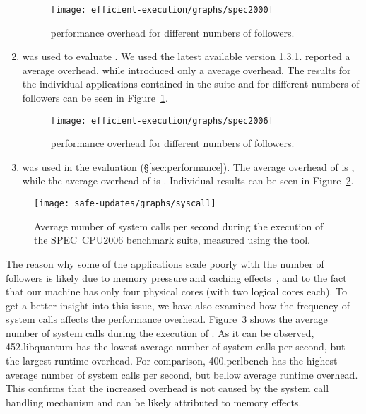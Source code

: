 \begin{enumerate}
\begin{figure}[!t]
  \centering
  \texttt{[image: efficient-execution/graphs/spec2000]}
  \caption{\speczerozero performance overhead for different numbers of followers.}
  \label{fig:spec2000}
\end{figure}

\item[\speczerozero\footnote{\url{http://www.spec.org/cpu2000/}}]
was used to evaluate \orchestra.  We used the latest available version 1.3.1.
\orchestra reported a \orchestraSpec average overhead, while \varan introduced
only a \speczerozeroOneFollower average overhead. The results for the
individual applications contained in the \speczerozero suite and for different
numbers of followers can be seen in Figure~\ref{fig:spec2000}.

\begin{figure}[!t]
  \centering
  \texttt{[image: efficient-execution/graphs/spec2006]}
  \caption{\speczerosix performance overhead for different numbers of followers.}
  \label{fig:spec2006}
\end{figure}

\item[\speczerosix\footnote{\url{http://www.spec.org/cpu2006/}}]
was used in the \mx evaluation (\S\ref{sec:performance}). The average overhead
of \mx is \mxSpec, while the average overhead of \varan is
\speczerosixOneFollower.  Individual results can be seen in
Figure~\ref{fig:spec2006}.

\end{enumerate}

\begin{figure}[ht]
\begin{center}
\texttt{[image: safe-updates/graphs/syscall]}
\caption{Average number of system calls per second during the execution of the
SPEC~CPU2006 benchmark suite, measured using the \strace tool.}
\label{fig:syscall}
\end{center}
\end{figure}

The reason why some of the \speccpu applications scale poorly with the number
of followers is likely due to memory pressure and caching
effects~\cite{jaleel07}, and to the fact that our machine has only four
physical cores (with two logical cores each). To get a better insight into this
issue, we have also examined how the frequency of system calls affects the
performance overhead. Figure~\ref{fig:syscall} shows the average number of
system calls during the execution of \speczerosix. As it can be observed,
\textsf{452.libquantum} has the lowest average number of system calls per
second, but the largest runtime overhead. For comparison, \textsf{400.perlbench}
has the highest average number of system calls per second, but bellow average
runtime overhead. This confirms that the increased overhead is not caused by
the system call handling mechanism and can be likely attributed to memory
effects.

